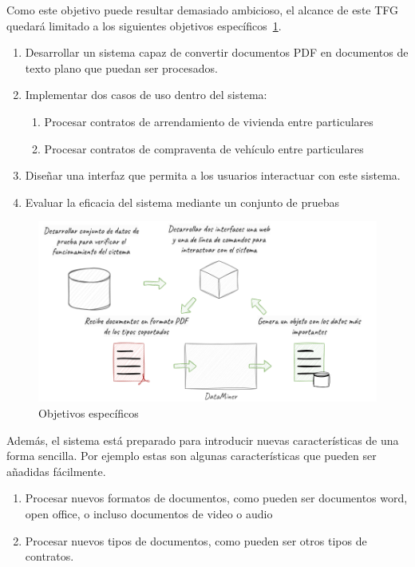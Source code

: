 Como este objetivo puede resultar demasiado ambicioso, el alcance de este TFG quedará limitado a los siguientes
objetivos específicos~\ref{fig:chapter_1.specific}.

\begin{enumerate}
    \item
    Desarrollar un sistema capaz de convertir documentos PDF en documentos de texto plano que puedan ser procesados.
    \item Implementar dos casos de uso dentro del sistema:
    \begin{enumerate}
        \item Procesar contratos de arrendamiento de vivienda entre particulares
        \item Procesar contratos de compraventa de vehículo entre particulares
    \end{enumerate}
    \item Diseñar una interfaz que permita a los usuarios interactuar con este sistema.
    \item Evaluar la eficacia del sistema mediante un conjunto de pruebas
\end{enumerate}

\begin{figure}[ht]
    \begin{center}
        \includegraphics[width=\textwidth]{./chapter/images/chapter_1.specific}
        \caption{Objetivos específicos}
        \label{fig:chapter_1.specific}
    \end{center}
\end{figure}

Además, el sistema está preparado para introducir nuevas características de una forma sencilla.
Por ejemplo estas son algunas características que pueden ser añadidas fácilmente.

\begin{enumerate}
    \item
    Procesar nuevos formatos de documentos, como pueden ser documentos word, open office, o incluso documentos de video
    o audio
    \item
    Procesar nuevos tipos de documentos, como pueden ser otros tipos de contratos.
\end{enumerate}
